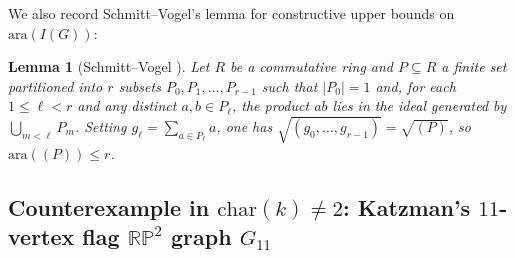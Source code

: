 \documentclass[11pt,a4paper]{amsart}
\theoremstyle{plain}
\newtheorem{lemma}[theorem]{Lemma}
\theoremstyle{definition}
\newcommand{\ara}{\mathrm{ara}}
\newcommand{\RP}{\mathbb{RP}}
\begin{document}
We also record Schmitt--Vogel's lemma for constructive upper bounds on $\ara(I(G))$:

\begin{lemma}[Schmitt--Vogel {\cite[Lemma, p.~249]{SchmittVogel1979}}]\label{lem:sv}
Let $R$ be a commutative ring and $P \subseteq R$ a finite set partitioned into $r$ subsets $P_0, P_1, \dots, P_{r-1}$ such that $|P_0| = 1$ and, for each $1 \le \ell < r$ and any distinct $a, b \in P_\ell$, the product $ab$ lies in the ideal generated by $\bigcup_{m < \ell} P_m$. Setting $g_\ell = \sum_{a \in P_\ell} a$, one has $\sqrt{(g_0,\dots,g_{r-1})} = \sqrt{(P)}$, so $\ara((P)) \le r$.
\end{lemma}

\subsection{Counterexample in \texorpdfstring{$\mathrm{char}(k) \neq 2$}{char(k) != 2}: Katzman's \texorpdfstring{$11$}{11}-vertex flag \texorpdfstring{$\RP^2$}{RP2} graph \texorpdfstring{$G_{11}$}{G11}}
\end{document}
